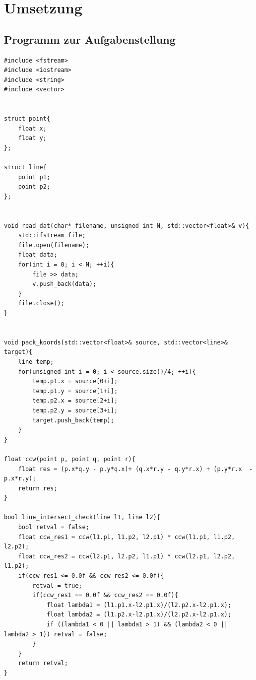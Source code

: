 \documentclass[12pt]{scrartcl}
\begin{document}
\section{Umsetzung}

\subsection{Programm zur Aufgabenstellung}

\begin{lstlisting}[style=CStyle, caption={p1\_lib.h: Bibliotheksfunktionen},captionpos=b]
#include <fstream>
#include <iostream>
#include <string>
#include <vector>


struct point{
    float x;
    float y;
};

struct line{
    point p1;
    point p2;
};


void read_dat(char* filename, unsigned int N, std::vector<float>& v){
    std::ifstream file;
    file.open(filename);
    float data;
    for(int i = 0; i < N; ++i){
        file >> data;
        v.push_back(data);
    }
    file.close();
}


void pack_koords(std::vector<float>& source, std::vector<line>& target){
    line temp;
    for(unsigned int i = 0; i < source.size()/4; ++i){
        temp.p1.x = source[0+i];
        temp.p1.y = source[1+i];
        temp.p2.x = source[2+i];
        temp.p2.y = source[3+i];
        target.push_back(temp);
    }
}

float ccw(point p, point q, point r){
    float res = (p.x*q.y - p.y*q.x)+ (q.x*r.y - q.y*r.x) + (p.y*r.x  - p.x*r.y);
    return res;
}

bool line_intersect_check(line l1, line l2){
    bool retval = false;
    float ccw_res1 = ccw(l1.p1, l1.p2, l2.p1) * ccw(l1.p1, l1.p2, l2.p2);
    float ccw_res2 = ccw(l2.p1, l2.p2, l1.p1) * ccw(l2.p1, l2.p2, l1.p2);
    if(ccw_res1 <= 0.0f && ccw_res2 <= 0.0f){
        retval = true;
        if(ccw_res1 == 0.0f && ccw_res2 == 0.0f){
            float lambda1 = (l1.p1.x-l2.p1.x)/(l2.p2.x-l2.p1.x);
            float lambda2 = (l1.p2.x-l2.p1.x)/(l2.p2.x-l2.p1.x);
            if ((lambda1 < 0 || lambda1 > 1) && (lambda2 < 0 || lambda2 > 1)) retval = false;
        }
    }
    return retval;
}
\end{lstlisting}
\end{document}

